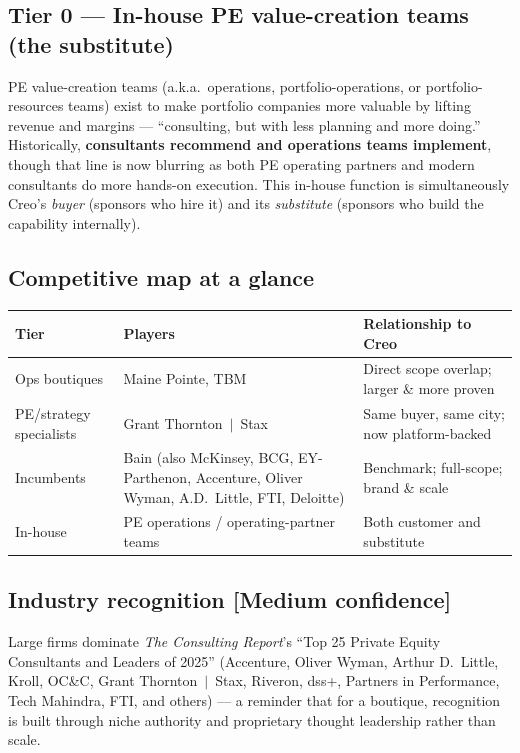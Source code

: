 \documentclass[11pt]{article}
\newcommand{\medium}{\textcolor{orange!80!black}{\textbf{[Medium confidence]}}}
\begin{document}
\subsection{Tier 0 --- In-house PE value-creation teams (the substitute)}
PE value-creation teams (a.k.a.\ operations, portfolio-operations, or
portfolio-resources teams) exist to make portfolio companies more valuable by
lifting revenue and margins --- ``consulting, but with less planning and more
doing.'' Historically, \textbf{consultants recommend and operations teams
implement}, though that line is now blurring as both PE operating partners and
modern consultants do more hands-on execution. This in-house function is
simultaneously Creo's \emph{buyer} (sponsors who hire it) and its
\emph{substitute} (sponsors who build the capability internally).

\subsection{Competitive map at a glance}
\begin{center}
\renewcommand{\arraystretch}{1.3}
\begin{tabular}{p{3.0cm} p{4.3cm} p{5.6cm}}
\toprule
\textbf{Tier} & \textbf{Players} & \textbf{Relationship to Creo} \\
\midrule
Ops boutiques & Maine Pointe, TBM & Direct scope overlap; larger \& more proven \\
PE/strategy specialists & Grant Thornton~$\vert$~Stax & Same buyer, same city; now platform-backed \\
Incumbents & Bain (also Mc\-Kinsey, BCG, EY-Parthenon, Accenture, Oliver Wyman, A.D.\ Little, FTI, Deloitte) & Benchmark; full-scope; brand \& scale \\
In-house & PE operations / operating-partner teams & Both customer and substitute \\
\bottomrule
\end{tabular}
\end{center}

\subsection{Industry recognition \medium}
Large firms dominate \emph{The Consulting Report}'s ``Top 25 Private
Equity Consultants and Leaders of 2025'' (Accenture, Oliver Wyman, Arthur D.\
Little, Kroll, OC\&C, Grant Thornton~$\vert$~Stax, Riveron, dss+, Partners in
Performance, Tech Mahindra, FTI, and others) --- a reminder that for a boutique,
recognition is built through niche authority and proprietary thought leadership
rather than scale.
\end{document}
